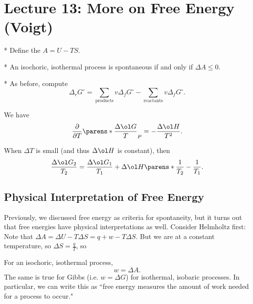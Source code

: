 \section*{Lecture 13: More on Free Energy (Voigt)}
\setcounter{section}{13}

\begin{defn}*
	Define the  $A = U - TS$.
\end{defn}

\begin{fact}*
	An isochoric, isothermal process is spontaneous if and only if $\Delta A \leq 0$.
\end{fact}

\begin{fact}*
	As before, compute \[
		\Delta_r G^\circ = \sum_{\text{products}} v \Delta_f  G^\circ - \sum_{\text{reactants}} v\Delta_f G^\circ.
	\]
\end{fact}

\begin{thm}
	We have \[
		\frac{\partial}{\partial T} \parens*{\frac{\Delta \ol G}{T}}_P = -\frac{\Delta \ol H}{T^2}.
	\]
\end{thm}

\begin{cor}
	When $\Delta T$ is small (and thus $\Delta \ol H$ is constant), then \[
		\frac{\Delta \ol G_2}{T_2} = \frac{\Delta \ol G_1}{T_1} + \Delta \ol H \parens*{\frac 1{T_2} - \frac 1{T_1}}.
	\]
\end{cor}

\subsection{Physical Interpretation of Free Energy}

Previously, we discussed free energy as criteria for spontaneity, but it turns out that free energies have physical interpretations as well. Consider Helmholtz first:
Note that $\Delta A = \Delta U - T\Delta S = q+w - T\Delta S$. But we are at a constant temperature, so $\Delta S = \frac qT$, so 
\begin{fact}
	For an isochoric, isothermal process, \[
		w = \Delta A.
	\]
	The same is true for Gibbs (i.e. $w = \Delta G$) for isothermal, isobaric processes.
	In particular, we can write this as ``free energy measures the amount of work needed for a process to occur."
\end{fact}







